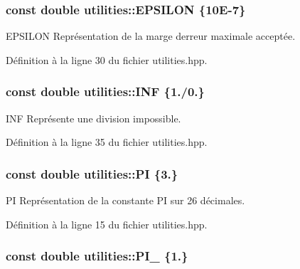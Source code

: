 \subsubsection[{E\+P\+S\+I\+L\+O\+N}]{\setlength{\rightskip}{0pt plus 5cm}const double utilities\+::\+E\+P\+S\+I\+L\+O\+N \{10\+E-\/7\}}\label{namespaceutilities_adf3b0db93e9d9a6057599d3629607c72}


E\+P\+S\+I\+L\+O\+N Représentation de la marge d\textquotesingle{}erreur maximale acceptée. 



Définition à la ligne 30 du fichier utilities.\+hpp.

\hypertarget{namespaceutilities_a529a96864a1cf035034ba593a44e710e}{}
\subsubsection[{I\+N\+F}]{\setlength{\rightskip}{0pt plus 5cm}const double utilities\+::\+I\+N\+F \{1./0.\}}\label{namespaceutilities_a529a96864a1cf035034ba593a44e710e}


I\+N\+F Représente une division impossible. 



Définition à la ligne 35 du fichier utilities.\+hpp.

\hypertarget{namespaceutilities_ae00ae0a208e66ecba0e8a4626ff8e07c}{}
\subsubsection[{P\+I}]{\setlength{\rightskip}{0pt plus 5cm}const double utilities\+::\+P\+I \{3.\}}\label{namespaceutilities_ae00ae0a208e66ecba0e8a4626ff8e07c}


P\+I Représentation de la constante P\+I sur 26 décimales. 



Définition à la ligne 15 du fichier utilities.\+hpp.

\hypertarget{namespaceutilities_ac617217c4d0e0d488959d1a4ece31570}{}
\subsubsection[{P\+I\+\_\+2}]{\setlength{\rightskip}{0pt plus 5cm}const double utilities\+::\+P\+I\+\_ \{1.\}}\label{namespaceutilities_ac617217c4d0e0d488959d1a4ece31570}


